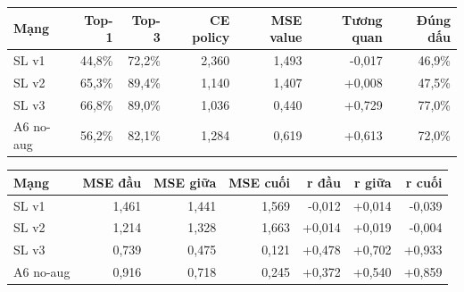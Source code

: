 \begin{center}\small
\begin{tabular}{@{}lrrrrrr@{}}
\toprule
Mạng & Top-1 & Top-3 & CE policy & MSE value & Tương quan & Đúng dấu \\
\midrule
SL v1 & 44,8\% & 72,2\% & 2,360 & 1,493 & -0,017 & 46,9\% \\
SL v2 & 65,3\% & 89,4\% & 1,140 & 1,407 & +0,008 & 47,5\% \\
SL v3 & 66,8\% & 89,0\% & 1,036 & 0,440 & +0,729 & 77,0\% \\
A6 no-aug & 56,2\% & 82,1\% & 1,284 & 0,619 & +0,613 & 72,0\% \\
\bottomrule
\end{tabular}
\end{center}
\begin{center}\small
\begin{tabular}{@{}lrrrrrr@{}}
\toprule
Mạng & MSE đầu & MSE giữa & MSE cuối & r đầu & r giữa & r cuối \\
\midrule
SL v1 & 1,461 & 1,441 & 1,569 & -0,012 & +0,014 & -0,039 \\
SL v2 & 1,214 & 1,328 & 1,663 & +0,014 & +0,019 & -0,004 \\
SL v3 & 0,739 & 0,475 & 0,121 & +0,478 & +0,702 & +0,933 \\
A6 no-aug & 0,916 & 0,718 & 0,245 & +0,372 & +0,540 & +0,859 \\
\bottomrule
\end{tabular}
\end{center}